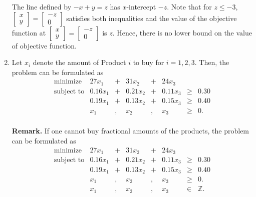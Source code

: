 \begin{enumerate}
  The line defined by \(-x + y = z\) has \(x\)-intercept \(-z\). Note
  that for \(z \leq -3\),
  \(\begin{bmatrix} x\\y \end{bmatrix} = \begin{bmatrix} -z\\ 0\end{bmatrix}\)
  satisfies both inequalities and the value of the objective function at
  \(\begin{bmatrix} x\\y \end{bmatrix} = \begin{bmatrix} -z\\ 0\end{bmatrix}\)
  is \(z\). Hence, there is no lower bound on the value of objective
  function.
\item
  Let \(x_i\) denote the amount of Product \(i\) to buy for
  \(i = 1,2,3\). Then, the problem can be formulated as
  \[\begin{array}{rrcrcrll}
  \mbox{minimize } & 27 x_1 & + & 31 x_2 & + & 24 x_3 \\
  \mbox{subject to} 
  & 0.16 x_1 & + & 0.21 x_2 & + & 0.11 x_3 & \geq & 0.30 \\
  & 0.19 x_1 & + & 0.13 x_2 & + & 0.15 x_3 & \geq & 0.40 \\
  & x_1 & , & x_2 & , & x_3 & \geq & 0. \\
  \end{array}\]

  \textbf{Remark.} If one cannot buy fractional amounts of the products,
  the problem can be formulated as \[\begin{array}{rrcrcrll}
  \mbox{minimize } & 27 x_1 & + & 31 x_2 & + & 24 x_3 \\
  \mbox{subject to} 
  & 0.16 x_1 & + & 0.21 x_2 & + & 0.11 x_3 & \geq & 0.30 \\
  & 0.19 x_1 & + & 0.13 x_2 & + & 0.15 x_3 & \geq & 0.40 \\
  & x_1 & , & x_2 & , & x_3 & \geq & 0. \\
  & x_1 & , & x_2 & , & x_3 & \in & \mathbb{Z}. \\
  \end{array}\]
\end{enumerate}


